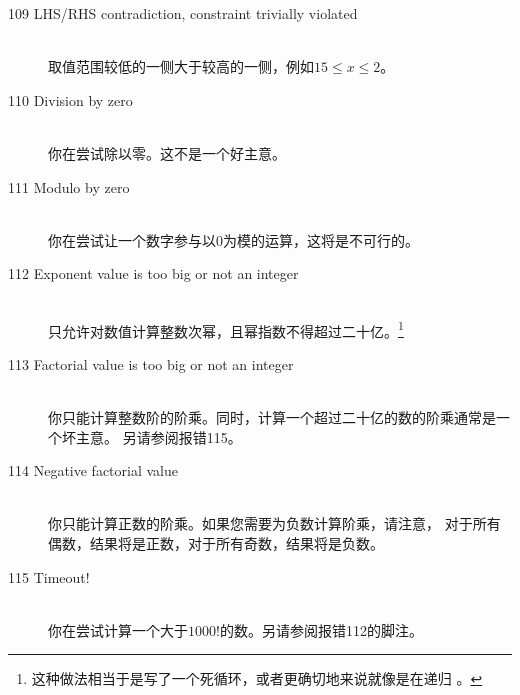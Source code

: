 \begin{description}
\item[109 LHS/RHS contradiction, constraint trivially violated]\ \\
  取值范围较低的一侧大于较高的一侧，例如$15\leq x\leq 2$。
\item[110 Division by zero]\ \\
  你在尝试除以零。这不是一个好主意。
\item[111 Modulo by zero]\ \\
  你在尝试让一个数字参与以0为模的运算，这将是不可行的。
\item[112 Exponent value  is too big or not an integer]\ \\
  只允许对数值计算整数次幂，且幂指数不得超过二十亿。\footnote{
    这种做法相当于是写了一个死循环，或者更确切地来说就像是在递归
    。}
\item[113 Factorial value  is too big or not an integer]\ \\
  你只能计算整数阶的阶乘。同时，计算一个超过二十亿的数的阶乘通常是一个坏主意。
  另请参阅报错115。
\item[114 Negative factorial value]\ \\
  你只能计算正数的阶乘。如果您需要为负数计算阶乘，请注意，
  对于所有偶数，结果将是正数，对于所有奇数，结果将是负数。
\item[115 Timeout!]\ \\
  你在尝试计算一个大于$1000!$的数。另请参阅报错112的脚注。

\end{description}
